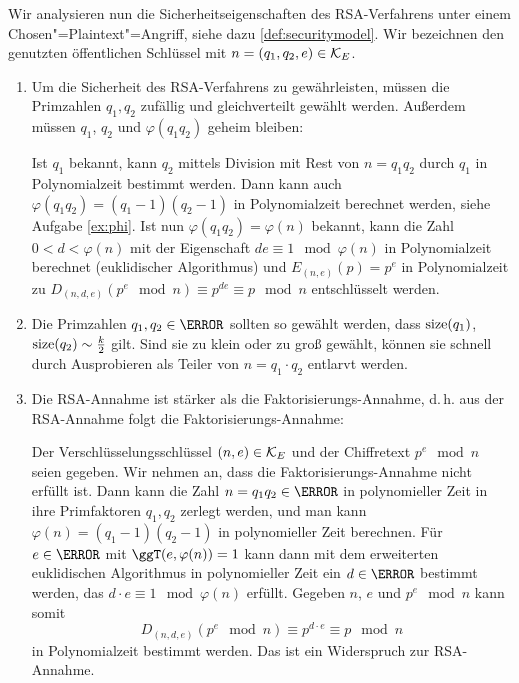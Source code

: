 Wir analysieren nun die Sicherheitseigenschaften des RSA-Verfahrens unter einem Chosen"=Plaintext"=Angriff, siehe dazu \ref{def:securitymodel}. Wir bezeichnen den genutzten öffentlichen Schlüssel mit $n = (q_1, q_2, e) \in \mathcal K_E$.
 \begin{enumerate}
 \item Um die Sicherheit des RSA-Verfahrens zu gewährleisten, müssen die Primzahlen $q_1, q_2$ zufällig und gleichverteilt gewählt werden. Außerdem müssen $q_1$, $q_2$ und $\varphi(q_1q_2)$ geheim bleiben: 
 
 Ist $q_1$ bekannt, kann $q_2$ mittels Division mit Rest von $n = q_1q_2$ durch $q_1$ in Polynomialzeit bestimmt werden. Dann kann auch $\varphi(q_1q_2) = (q_1-1)(q_2 -1)$ in Polynomialzeit berechnet werden, siehe Aufgabe \ref{ex:phi}. Ist nun $\varphi(q_1q_2) = \varphi(n)$ bekannt, kann die Zahl $0 < d < \varphi(n)$ mit der Eigenschaft $de ≡ 1 \mod \varphi(n)$ in Polynomialzeit berechnet (euklidischer Algorithmus) und $E_{(n, e)}(p) = p^e$ in Polynomialzeit zu $D_{(n, d, e)}(p^e \mod n) \equiv p^{de} \equiv p \mod n$ entschlüsselt werden.
 
 \item Die Primzahlen $q_1, q_2 \in \N$ sollten so gewählt werden, dass $\operatorname{size}(q_1)$, $\operatorname{size}(q_2) \sim \frac k 2$ gilt. Sind sie zu klein oder zu groß gewählt, können sie schnell durch Ausprobieren als Teiler von $n = q_1 \cdot q_2$ entlarvt werden. 
 \item Die RSA-Annahme ist stärker als die Faktorisierungs-Annahme, d.\,h. aus der RSA-Annahme folgt die Faktorisierungs-Annahme: 
 
 Der Verschlüsselungsschlüssel $(n, e) \in \mathcal K_E$ und der Chiffretext $p^e \mod n$ seien gegeben. Wir nehmen an, dass die Faktorisierungs-Annahme nicht erfüllt ist. Dann kann die Zahl $n = q_1q_2 \in \N$ in polynomieller Zeit in ihre Primfaktoren $q_1, q_2$ zerlegt werden, und man kann $\varphi(n) = (q_1-1)(q_2-1)$ in polynomieller Zeit berechnen. Für $e \in \N$ mit $\ggT(e, \varphi(n))= 1$ kann dann mit dem erweiterten euklidischen Algorithmus in polynomieller Zeit ein $d \in \N$ bestimmt werden, das $d \cdot e \equiv 1 \mod \varphi(n)$ erfüllt. Gegeben $n$, $e$ und $p^e \mod n$ kann somit 
 \[D_{(n, d, e)}(p^e \mod n) \equiv p^{d⋅ e} \equiv p \mod n\]
 in Polynomialzeit bestimmt werden. Das ist ein Widerspruch zur RSA-Annahme.
 

\end{enumerate}
